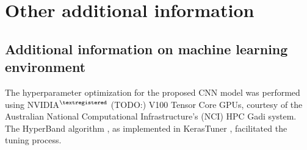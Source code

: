 
\section{Other additional information}

\subsection{Additional information on machine learning environment}

The hyperparameter optimization for the proposed CNN model was performed using NVIDIA$^{\textregistered}$ (TODO:) V100 Tensor Core GPUs,
courtesy of the Australian National Computational Infrastructure's (NCI) HPC Gadi system.
The HyperBand algorithm \cite{li2018hyperband}, as implemented in KerasTuner \cite{omalley2019kerastuner} , facilitated the tuning process.

